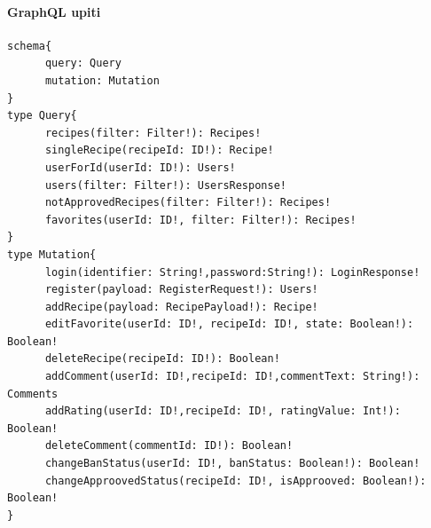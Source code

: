 \documentclass[times, utf8, zavrsni]{fer}
\begin{document}
\paragraph{GraphQL upiti}
\label{graphqlSchema}
\begin{Verbatim}[fontsize=\scriptsize]
schema{
      query: Query
      mutation: Mutation
}
type Query{
      recipes(filter: Filter!): Recipes!
      singleRecipe(recipeId: ID!): Recipe!
      userForId(userId: ID!): Users!
      users(filter: Filter!): UsersResponse!
      notApprovedRecipes(filter: Filter!): Recipes!
      favorites(userId: ID!, filter: Filter!): Recipes!
}
type Mutation{
      login(identifier: String!,password:String!): LoginResponse!
      register(payload: RegisterRequest!): Users!
      addRecipe(payload: RecipePayload!): Recipe!
      editFavorite(userId: ID!, recipeId: ID!, state: Boolean!): Boolean!
      deleteRecipe(recipeId: ID!): Boolean!
      addComment(userId: ID!,recipeId: ID!,commentText: String!): Comments
      addRating(userId: ID!,recipeId: ID!, ratingValue: Int!): Boolean!
      deleteComment(commentId: ID!): Boolean!
      changeBanStatus(userId: ID!, banStatus: Boolean!): Boolean!
      changeApproovedStatus(recipeId: ID!, isApprooved: Boolean!): Boolean!
}
\end{Verbatim}
\end{document}
